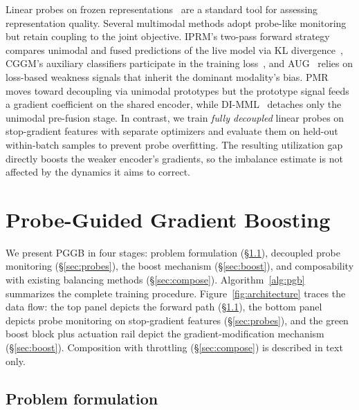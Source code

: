\documentclass{article}
\begin{document}
Linear probes on frozen representations~\citep{alain2017understanding} are a standard tool for assessing representation quality. Several multimodal methods adopt probe-like monitoring but retain coupling to the joint objective. IPRM's two-pass forward strategy compares unimodal and fused predictions of the live model via KL divergence~\citep{yang2025iprm}, CGGM's auxiliary classifiers participate in the training loss~\citep{guo2024cggm}, and AUG~\citep{jiang2025aug} relies on loss-based weakness signals that inherit the dominant modality's bias. PMR~\citep{fan2023pmr} moves toward decoupling via unimodal prototypes but the prototype signal feeds a gradient coefficient on the shared encoder, while DI-MML~\citep{fan2024dimml} detaches only the unimodal pre-fusion stage. In contrast, we train \emph{fully decoupled} linear probes on stop-gradient features with separate optimizers and evaluate them on held-out within-batch samples to prevent probe overfitting. The resulting utilization gap directly boosts the weaker encoder's gradients, so the imbalance estimate is not affected by the dynamics it aims to correct.


\section{Probe-Guided Gradient Boosting}
\label{sec:method}

We present PGGB in four stages: problem formulation (\S\ref{sec:problem}), decoupled probe monitoring (\S\ref{sec:probes}), the boost mechanism (\S\ref{sec:boost}), and composability with existing balancing methods (\S\ref{sec:compose}). Algorithm~\ref{alg:pgb} summarizes the complete training procedure. Figure~\ref{fig:architecture} traces the data flow: the top panel depicts the forward path (\S\ref{sec:problem}), the bottom panel depicts probe monitoring on stop-gradient features (\S\ref{sec:probes}), and the green boost block plus actuation rail depict the gradient-modification mechanism (\S\ref{sec:boost}). Composition with throttling (\S\ref{sec:compose}) is described in text only.

\subsection{Problem formulation}
\label{sec:problem}
\end{document}
